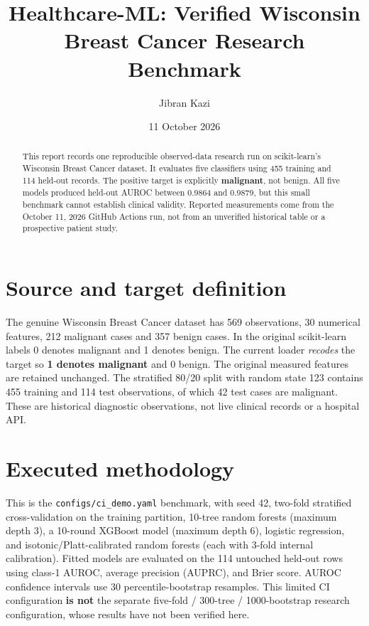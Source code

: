 \documentclass[10pt]{article}
\title{Healthcare-ML: Verified Wisconsin Breast Cancer Research Benchmark}
\author{Jibran Kazi}
\date{11 October 2026}
\begin{document}
\maketitle

\begin{abstract}
This report records one reproducible observed-data research run on scikit-learn's
Wisconsin Breast Cancer dataset. It evaluates five classifiers using 455 training
and 114 held-out records. The positive target is explicitly \textbf{malignant},
not benign. All five models produced held-out AUROC between 0.9864 and 0.9879,
but this small benchmark cannot establish clinical validity. Reported measurements
come from the October 11, 2026 GitHub Actions run, not from an unverified
historical table or a prospective patient study.
\end{abstract}

\section{Source and target definition}
The genuine Wisconsin Breast Cancer dataset has 569 observations, 30 numerical
features, 212 malignant cases and 357 benign cases. In the original scikit-learn
labels 0 denotes malignant and 1 denotes benign. The current loader \emph{recodes}
the target so \textbf{1 denotes malignant} and 0 benign. The original measured
features are retained unchanged. The stratified 80/20 split with random state
123 contains 455 training and 114 test observations, of which 42 test cases
are malignant. These are historical diagnostic observations, not live clinical
records or a hospital API.

\section{Executed methodology}
This is the \texttt{configs/ci\_demo.yaml} benchmark, with seed 42,
two-fold stratified cross-validation on the training partition,
10-tree random forests (maximum depth 3), a 10-round XGBoost model
(maximum depth 6), logistic regression, and isotonic/Platt-calibrated
random forests (each with 3-fold internal calibration). Fitted models
are evaluated on the 114 untouched held-out rows using class-1 AUROC,
average precision (AUPRC), and Brier score. AUROC confidence intervals
use 30 percentile-bootstrap resamples. This limited CI configuration
\textbf{is not} the separate five-fold / 300-tree / 1000-bootstrap
research configuration, whose results have not been verified here.
\end{document}

